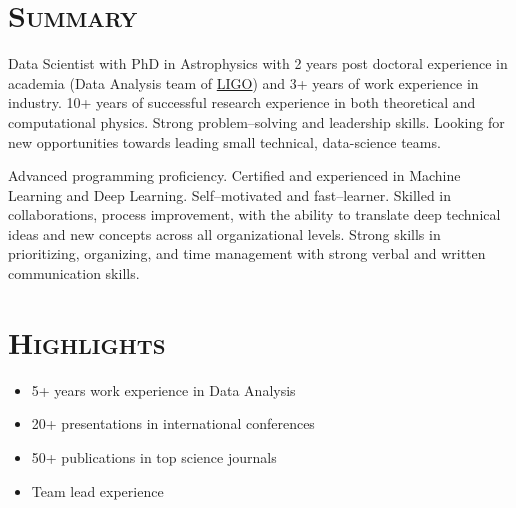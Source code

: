 \documentclass[10pt,a4paper]{moderncv}
\begin{document}
\maketitle


\section{\textsc{Summary}}

Data Scientist with PhD in Astrophysics with 2 years post doctoral experience in academia (Data Analysis team of \href{http://www.ligo.org}{LIGO}) and 3+ years of work experience in industry. 10+ years of successful research experience in both theoretical and computational physics. Strong problem–solving and leadership skills. Looking for new opportunities towards leading small technical, data-science teams.
\vspace{0.2cm}

Advanced programming proficiency. Certified and experienced in Machine Learning and Deep Learning. Self–motivated and fast–learner. Skilled in collaborations, process improvement, with the ability to translate deep technical ideas and new concepts across all organizational levels. Strong skills in prioritizing, organizing, and time management with strong verbal and written communication skills.

\section{\textsc{Highlights}}
\vspace{-0.5cm}
\begin{multicols}{2}
\begin{itemize}
\item 5+ years work experience in Data Analysis
\item 20+ presentations in international conferences
\item 50+ publications in top science journals
\item Team lead experience
\end{itemize}
\end{multicols}
\vspace{-0.5cm}
\end{document}
